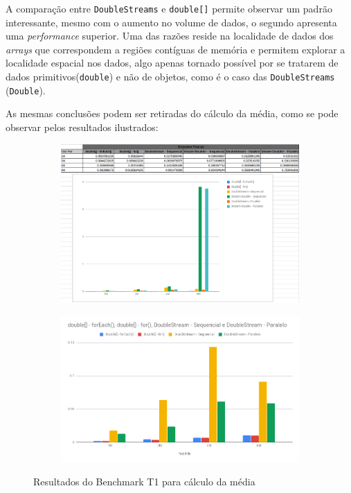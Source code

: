 \documentclass{article}
\begin{document}
A comparação entre \texttt{DoubleStreams} e \texttt{double[]} permite observar um padrão interessante, mesmo com o aumento no volume de dados, o segundo apresenta uma 
\textit{performance} superior. Uma das razões reside na localidade de dados dos \textit{arrays} que correspondem a regiões contíguas de memória e permitem explorar a 
localidade espacial nos dados, algo apenas tornado possível por se tratarem de dados primitivos(\texttt{double}) e não de objetos, como é o caso das 
\texttt{DoubleStreams} (\texttt{Double}).

As mesmas conclusões podem ser retiradas do cálculo da média, como se pode observar pelos resultados ilustrados:


\begin{figure}[H]
\centering
\begin{subfigure}{.5\textwidth}
  \centering
  \includegraphics[width=1\linewidth]{Pictures/T1_2.png}
\end{subfigure}%
\begin{subfigure}{.5\textwidth}
  \centering
  \includegraphics[width=1\linewidth]{Pictures/T1_3.png}
\end{subfigure}
\caption{Resultados do Benchmark T1 para cálculo da média}
\label{fig:sharedt}
\end{figure}
\end{document}
